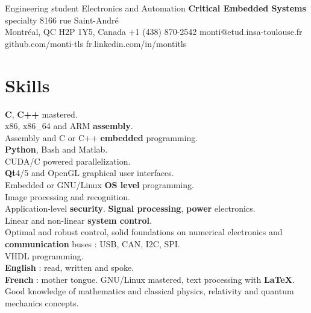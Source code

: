 \documentclass{custom_cv}
\begin{document}
\renewcommand{\TFrom}{From}
\renewcommand{\Tto}{to}
\renewcommand{\Tof}{of}
\renewcommand{\TFooter}{}

           {Engineering student}
           {Electronics and Automation}
           {\textbf{Critical Embedded Systems} specialty}
           {8166 rue Saint-André\\Montréal, QC H2P 1Y5, Canada}
           {+1 (438) 870-2542}
           {monti@etud.insa-toulouse.fr}
           {github.com/monti-tls}
           {fr.linkedin.com/in/montitls}

\section{Skills}

\begin{Skills}%
{\textbf{C}, \textbf{C++} mastered.\\
x86, x86\_64 and ARM \textbf{assembly}.\\
Assembly and C or C++ \textbf{embedded} programming.\\
\textbf{Python}, Bash and Matlab.\\
CUDA/C powered parallelization.\\
\textbf{Qt}4/5 and OpenGL graphical user interfaces.\\
Embedded or GNU/Linux \textbf{OS level} programming.\\
Image processing and recognition.\\
Application-level \textbf{security}.}%
{\textbf{Signal processing}, \textbf{power} electronics.\\
Linear and non-linear \textbf{system control}.\\
Optimal and robust control, solid foundations on numerical electronics and \textbf{communication} buses : USB, CAN, I2C, SPI.\\
VHDL programming.}\\
{\textbf{English} : read, written and spoke.\\
\textbf{French} : mother tongue.}%
{GNU/Linux mastered, text processing with \textbf{\LaTeX}.\\
Good knowledge of mathematics and classical physics, relativity and quantum mechanics concepts.}%
\end{Skills}
\end{document}

